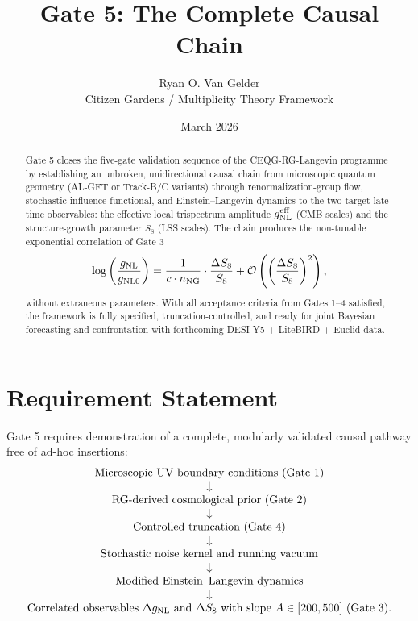 \documentclass[12pt]{article}
\title{Gate 5: The Complete Causal Chain}
\author{Ryan O. Van Gelder \\ Citizen Gardens / Multiplicity Theory Framework}
\date{March 2026}
\begin{document}
\maketitle

\begin{abstract}
Gate 5 closes the five-gate validation sequence of the CEQG-RG-Langevin programme by establishing an unbroken, unidirectional causal chain from microscopic quantum geometry (AL-GFT or Track-B/C variants) through renormalization-group flow, stochastic influence functional, and Einstein–Langevin dynamics to the two target late-time observables: the effective local trispectrum amplitude \(g_{\rm NL}^{\rm eff}\) (CMB scales) and the structure-growth parameter \(S_8\) (LSS scales). The chain produces the non-tunable exponential correlation of Gate 3
\[
\log\left(\frac{g_{\rm NL}}{g_{\rm NL0}}\right) = \frac{1}{c \cdot n_{\rm NG}} \cdot \frac{\Delta S_8}{S_8} + \mathcal{O}\left(\left(\frac{\Delta S_8}{S_8}\right)^2\right),
\]
without extraneous parameters. With all acceptance criteria from Gates 1–4 satisfied, the framework is fully specified, truncation-controlled, and ready for joint Bayesian forecasting and confrontation with forthcoming DESI Y5 + LiteBIRD + Euclid data.
\end{abstract}

\section{Requirement Statement}
Gate 5 requires demonstration of a complete, modularly validated causal pathway free of ad-hoc insertions:
\[
\begin{array}{c}
\text{Microscopic UV boundary conditions (Gate 1)} \\
\downarrow \\
\text{RG-derived cosmological prior (Gate 2)} \\
\downarrow \\
\text{Controlled truncation (Gate 4)} \\
\downarrow \\
\text{Stochastic noise kernel and running vacuum} \\
\downarrow \\
\text{Modified Einstein–Langevin dynamics} \\
\downarrow \\
\text{Correlated observables }\Delta g_{\rm NL}\text{ and }\Delta S_8\text{ with slope }A\in[200,500]\text{ (Gate 3)}.
\end{array}
\]
\end{document}
